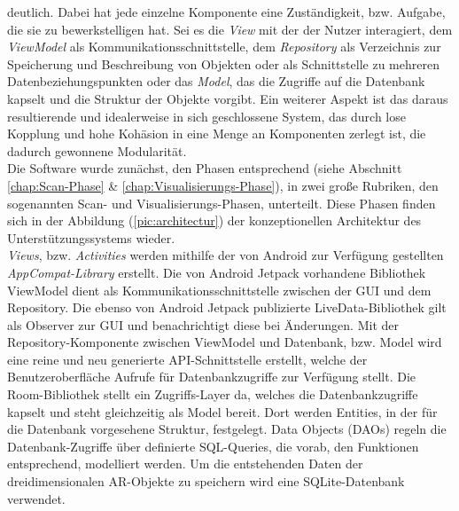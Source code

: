 deutlich. Dabei hat jede einzelne Komponente eine Zuständigkeit, bzw. Aufgabe, die sie zu bewerkstelligen hat. Sei es die \textit{View} 
mit der der Nutzer interagiert, dem \textit{ViewModel} als Kommunikationsschnittstelle, dem %
\textit{Repository} als Verzeichnis zur Speicherung und Beschreibung von Objekten oder als Schnittstelle zu mehreren Datenbeziehungspunkten 
oder das \textit{Model}, das die Zugriffe auf die Datenbank kapselt und die Struktur der Objekte vorgibt. %
Ein weiterer Aspekt ist das daraus resultierende und idealerweise in sich geschlossene System, das durch lose Kopplung und hohe Kohäsion in 
eine Menge an Komponenten zerlegt ist, die dadurch gewonnene Modularität. 
\\ 
\linebreak
Die Software wurde zunächst, den Phasen entsprechend (siehe Abschnitt \ref{chap:Scan-Phase} \& \ref{chap:Visualisierungs-Phase}), in zwei 
große Rubriken, den sogenannten Scan- und Visualisierungs-Phasen, unterteilt. Diese Phasen finden sich in der Abbildung (\ref{pic:architectur}) der 
konzeptionellen Architektur des Unterstützungssystems wieder. 
\\ 
\textit{Views}, bzw. \textit{Activities} werden mithilfe der von Android zur Verfügung gestellten \textit{AppCompat-Library} erstellt. Die 
von Android Jetpack vorhandene Bibliothek ViewModel dient als Kommunikationsschnittstelle zwischen der \acs{GUI} und dem Repository. 
Die ebenso von Android Jetpack publizierte LiveData-Bibliothek gilt als Observer zur \acs{GUI} und benachrichtigt diese bei Änderungen. Mit 
der Repository-Komponente zwischen ViewModel und Datenbank, bzw. Model wird eine reine und neu generierte \acs{API}-Schnittstelle erstellt, 
welche der Benutzeroberfläche Aufrufe für Datenbankzugriffe zur Verfügung stellt. Die Room-Bibliothek stellt ein Zugriffs-Layer da, welches 
die Datenbankzugriffe kapselt und steht gleichzeitig als Model bereit. Dort werden Entities, in der für die Datenbank vorgesehene 
Struktur, festgelegt. Data Objects (DAOs) regeln die Datenbank-Zugriffe über definierte SQL-Queries, die vorab, den Funktionen entsprechend, 
modelliert werden. Um die entstehenden Daten der dreidimensionalen \acs{AR}-Objekte zu speichern wird eine SQLite-Datenbank verwendet.
